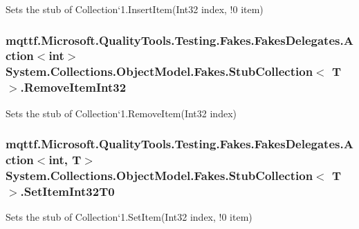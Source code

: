 Sets the stub of Collection`1.Insert\-Item(Int32 index, !0 item)

\hypertarget{class_system_1_1_collections_1_1_object_model_1_1_fakes_1_1_stub_collection_3_01_t_01_4_ac8dee38f68e104bc3a81ec53ae782554}{
\subsubsection[{Remove\-Item\-Int32}]{\setlength{\rightskip}{0pt plus 5cm}mqttf.\-Microsoft.\-Quality\-Tools.\-Testing.\-Fakes.\-Fakes\-Delegates.\-Action$<$int$>$ System.\-Collections.\-Object\-Model.\-Fakes.\-Stub\-Collection$<$ T $>$.Remove\-Item\-Int32}}\label{class_system_1_1_collections_1_1_object_model_1_1_fakes_1_1_stub_collection_3_01_t_01_4_ac8dee38f68e104bc3a81ec53ae782554}


Sets the stub of Collection`1.Remove\-Item(\-Int32 index)

\hypertarget{class_system_1_1_collections_1_1_object_model_1_1_fakes_1_1_stub_collection_3_01_t_01_4_aaf30045a1c3d531a9d08ecd6fcde0e95}{
\subsubsection[{Set\-Item\-Int32\-T0}]{\setlength{\rightskip}{0pt plus 5cm}mqttf.\-Microsoft.\-Quality\-Tools.\-Testing.\-Fakes.\-Fakes\-Delegates.\-Action$<$int, T$>$ System.\-Collections.\-Object\-Model.\-Fakes.\-Stub\-Collection$<$ T $>$.Set\-Item\-Int32\-T0}}\label{class_system_1_1_collections_1_1_object_model_1_1_fakes_1_1_stub_collection_3_01_t_01_4_aaf30045a1c3d531a9d08ecd6fcde0e95}


Sets the stub of Collection`1.Set\-Item(Int32 index, !0 item)



